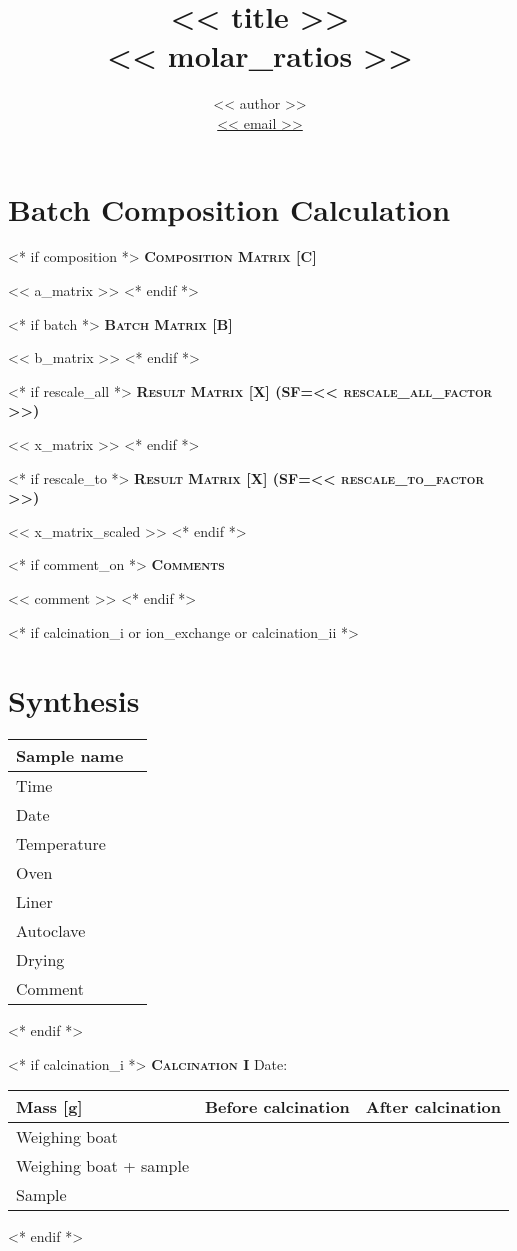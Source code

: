 \documentclass[10pt,a4paper]{article}
\title{<< title >> \\ {\large \normalfont << molar_ratios >>}}
\author{ << author >> \\
\href{mailto: << email >>}{{\color{bl}<< email >>}}\\}
\makeatletter
\newcommand{\subsecwithdate}[1]{{\color{bl}\scshape\bfseries\large {#1} }\hfill %
{\color{bl} Date: \Ovalbox{ \begin{minipage}{1.2in} \hfill\vspace{10pt} \end{minipage} }} \par}
\newcommand{\subsecwodate}[1]{{\color{bl}\scshape\bfseries\large {#1} } \par }
\def\printtitle{%
    {\color{bl} \centering \huge \sc \textbf{\@title}\par}}		%
\def\printauthor{%
    {\centering \small \@author}}				%
\makeatother
\begin{document}
\printtitle

\printauthor

\section{Batch Composition Calculation}
<* if composition *>
\subsecwodate{Composition Matrix [C]}
<< a_matrix >>
<* endif *>

<* if batch *>
\subsecwodate{Batch Matrix [B]}
<< b_matrix >>
<* endif *>

<* if rescale_all *>
\subsecwodate{Result Matrix [X] (SF=<< rescale_all_factor >>)}
<< x_matrix >>
<* endif *>

<* if rescale_to *>
\subsecwodate{Result Matrix [X] (SF=<< rescale_to_factor >>)}
<< x_matrix_scaled >>
<* endif *>

<* if comment_on *>
\subsecwodate{Comments}
<< comment >>
<* endif *>

<* if calcination_i or ion_exchange or calcination_ii *>
\newpage
\section{Synthesis}
\begin{center}
\begin{tabularx}{\textwidth}{l|C}
\toprule
Sample name & \\
\midrule
Time & \\ 
Date & \\ 
Temperature & \\ 
Oven & \\ 
Liner & \\ 
Autoclave & \\ 
Drying & \\ 
Comment & \\
\bottomrule
\end{tabularx}
\end{center}
<* endif *>

<* if calcination_i *>
\subsecwithdate{Calcination I}
\begin{center}
\begin{tabularx}{\textwidth}{l|C|C}
\toprule
Mass [g] & Before calcination & After calcination \\
\midrule
Weighing boat & & \\ 
Weighing boat + sample & & \\ 
Sample & & \\
\bottomrule
\end{tabularx}
\end{center}
<* endif *>
\end{document}
